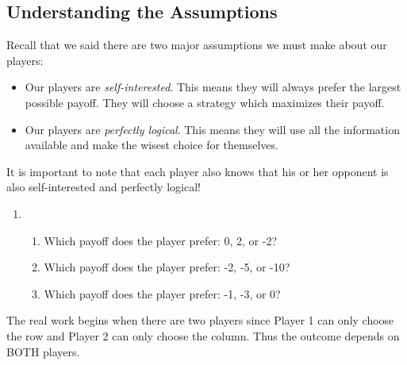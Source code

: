 
\subsection{Understanding the Assumptions}


\vspace{.2in}


Recall that we said there are two major assumptions we must make about our players:
\begin{itemize}
\item Our players are {\it self-interested}. This means they will always prefer the largest  possible payoff. They will choose a strategy which maximizes their payoff.
\item Our players are {\it perfectly logical}. This means they will use all the information available and make the wisest choice for themselves.
\end{itemize}
It is important to note that each player also knows that his or her opponent is also self-interested and perfectly logical!

\begin{enumerate}
\item %
\begin{enumerate}
\item Which payoff does the player prefer: 0, 2, or -2?
\item Which payoff does the player prefer: -2, -5, or -10?
\item Which payoff does the player prefer: -1, -3, or 0?
\end{enumerate}
\end{enumerate}
\vspace{.1in}

The real work begins when there are two players since Player 1 can only choose the row and Player 2 can only choose the column. Thus the outcome depends on BOTH players. 

